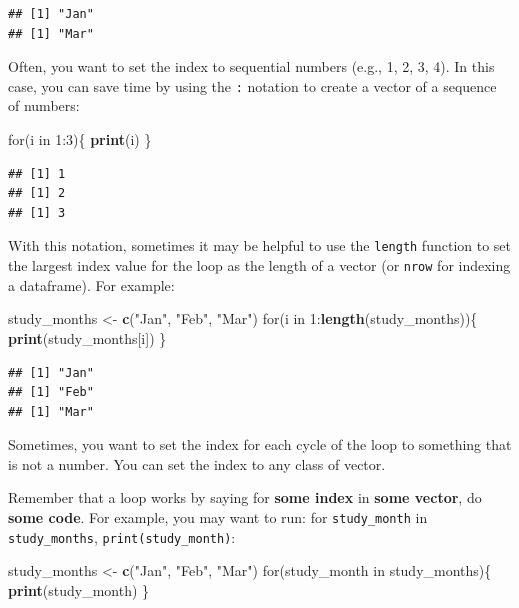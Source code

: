 \documentclass[]{book}
\makeatletter
\newenvironment{Shaded}{\begin{snugshade}}{\end{snugshade}}
\newcommand{\KeywordTok}[1]{\textcolor[rgb]{0.13,0.29,0.53}{\textbf{{#1}}}}
\newcommand{\DecValTok}[1]{\textcolor[rgb]{0.00,0.00,0.81}{{#1}}}
\newcommand{\StringTok}[1]{\textcolor[rgb]{0.31,0.60,0.02}{{#1}}}
\newcommand{\NormalTok}[1]{{#1}}
\newenvironment{kframe}{%
\medskip{}
\setlength{\fboxsep}{.8em}
 \def\at@end@of@kframe{}%
 \ifinner\ifhmode%
  \def\at@end@of@kframe{\end{minipage}}%
  \begin{minipage}{\columnwidth}%
 \fi\fi%
 \def\FrameCommand##1{\hskip\@totalleftmargin \hskip-\fboxsep
 \colorbox{shadecolor}{##1}\hskip-\fboxsep
     \hskip-\linewidth \hskip-\@totalleftmargin \hskip\columnwidth}%
 \MakeFramed {\advance\hsize-\width
   \@totalleftmargin\z@ \linewidth\hsize
   \@setminipage}}%
 {\par\unskip\endMakeFramed%
 \at@end@of@kframe}
\renewenvironment{Shaded}{\begin{kframe}}{\end{kframe}}
\makeatother
\begin{document}
\begin{verbatim}
## [1] "Jan"
## [1] "Mar"
\end{verbatim}

Often, you want to set the index to sequential numbers (e.g., 1, 2, 3,
4). In this case, you can save time by using the \texttt{:} notation to
create a vector of a sequence of numbers:

\begin{Shaded}
\begin{Highlighting}[]
\NormalTok{for(i in }\DecValTok{1}\NormalTok{:}\DecValTok{3}\NormalTok{)\{}
        \KeywordTok{print}\NormalTok{(i)}
\NormalTok{\}}
\end{Highlighting}
\end{Shaded}

\begin{verbatim}
## [1] 1
## [1] 2
## [1] 3
\end{verbatim}

With this notation, sometimes it may be helpful to use the
\texttt{length} function to set the largest index value for the loop as
the length of a vector (or \texttt{nrow} for indexing a dataframe). For
example:

\begin{Shaded}
\begin{Highlighting}[]
\NormalTok{study_months <-}\StringTok{ }\KeywordTok{c}\NormalTok{(}\StringTok{"Jan"}\NormalTok{, }\StringTok{"Feb"}\NormalTok{, }\StringTok{"Mar"}\NormalTok{)}
\NormalTok{for(i in }\DecValTok{1}\NormalTok{:}\KeywordTok{length}\NormalTok{(study_months))\{}
        \KeywordTok{print}\NormalTok{(study_months[i])}
\NormalTok{\}}
\end{Highlighting}
\end{Shaded}

\begin{verbatim}
## [1] "Jan"
## [1] "Feb"
## [1] "Mar"
\end{verbatim}

Sometimes, you want to set the index for each cycle of the loop to
something that is not a number. You can set the index to any class of
vector.

Remember that a loop works by saying for \textbf{some index} in
\textbf{some vector}, do \textbf{some code}. For example, you may want
to run: for \texttt{study\_month} in \texttt{study\_months},
\texttt{print(study\_month)}:

\begin{Shaded}
\begin{Highlighting}[]
\NormalTok{study_months <-}\StringTok{ }\KeywordTok{c}\NormalTok{(}\StringTok{"Jan"}\NormalTok{, }\StringTok{"Feb"}\NormalTok{, }\StringTok{"Mar"}\NormalTok{)}
\NormalTok{for(study_month in study_months)\{}
        \KeywordTok{print}\NormalTok{(study_month)}
\NormalTok{\}}
\end{Highlighting}
\end{Shaded}
\end{document}
